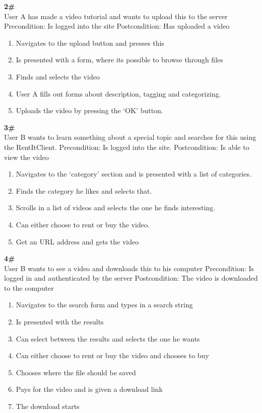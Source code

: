 \vspace{10pt}
\textbf{2\#}\\
User A has made a video tutorial and wants to upload this to the server
Precondition: Is logged into the site
Postcondition: Has uploaded a video
\begin{enumerate}
\item Navigates to the upload button and presses this
\item Is presented with a form, where its possible to browse through files
\item Finds and selects the video
\item User A fills out forms about description, tagging and categorizing.
\item Uploads the video by pressing the ‘OK’ button. 
\end{enumerate}

\vspace{10pt}
\textbf{3\# }\\
User B wants to learn something about a special topic and searches for this using the RentItClient. 
Precondition: Is logged into the site.
Postcondition: Is able to view the video
\begin{enumerate}
\item Navigates to the ‘category’ section and is presented with a list of categories. 
\item Finds the category he likes and selects that.
\item Scrolls in a list of videos and selects the one he finds interesting. 
\item Can either choose to rent or buy the video.
\item Get an URL address and gets the video
\end{enumerate}

\vspace{10pt}
\textbf{4\# }\\
User B wants to see a video and downloads this to his computer
Precondition: Is logged in and authenticated by the server 
Postcondition: The video is downloaded to the computer
\begin{enumerate}
\item Navigates to the search form and types in a search string
\item Is presented with the results
\item Can select between the results and selects the one he wants
\item Can either choose to rent or buy the video and chooses to buy
\item Chooses where the file should be saved
\item Pays for the video and is given a download link
\item The download starts
\end{enumerate}

